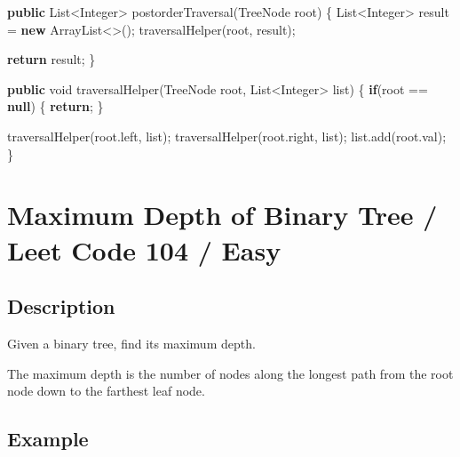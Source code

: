 \documentclass[]{book}
\newenvironment{Shaded}{\begin{snugshade}}{\end{snugshade}}
\newcommand{\BuiltInTok}[1]{#1}
\newcommand{\DataTypeTok}[1]{\textcolor[rgb]{0.13,0.29,0.53}{#1}}
\newcommand{\FunctionTok}[1]{\textcolor[rgb]{0.00,0.00,0.00}{#1}}
\newcommand{\KeywordTok}[1]{\textcolor[rgb]{0.13,0.29,0.53}{\textbf{#1}}}
\newcommand{\NormalTok}[1]{#1}
\begin{document}
\begin{Shaded}
\begin{Highlighting}[]
\KeywordTok{public} \BuiltInTok{List}\NormalTok{<}\BuiltInTok{Integer}\NormalTok{> }\FunctionTok{postorderTraversal}\NormalTok{(}\BuiltInTok{TreeNode}\NormalTok{ root) \{}
    \BuiltInTok{List}\NormalTok{<}\BuiltInTok{Integer}\NormalTok{> result = }\KeywordTok{new} \BuiltInTok{ArrayList}\NormalTok{<>();}
    \FunctionTok{traversalHelper}\NormalTok{(root, result);}

    \KeywordTok{return}\NormalTok{ result;}
\NormalTok{\}}

\KeywordTok{public} \DataTypeTok{void} \FunctionTok{traversalHelper}\NormalTok{(}\BuiltInTok{TreeNode}\NormalTok{ root, }\BuiltInTok{List}\NormalTok{<}\BuiltInTok{Integer}\NormalTok{> list) \{}
    \KeywordTok{if}\NormalTok{(root == }\KeywordTok{null}\NormalTok{) \{}
        \KeywordTok{return}\NormalTok{;}
\NormalTok{    \}}

    \FunctionTok{traversalHelper}\NormalTok{(root.}\FunctionTok{left}\NormalTok{, list);}
    \FunctionTok{traversalHelper}\NormalTok{(root.}\FunctionTok{right}\NormalTok{, list);}
\NormalTok{    list.}\FunctionTok{add}\NormalTok{(root.}\FunctionTok{val}\NormalTok{);}
\NormalTok{\}}
\end{Highlighting}
\end{Shaded}

\hypertarget{maximum-depth-of-binary-tree-leet-code-104-easy}{%
\section{Maximum Depth of Binary Tree / Leet Code 104 / Easy}\label{maximum-depth-of-binary-tree-leet-code-104-easy}}

\hypertarget{description-65}{%
\subsection{Description}\label{description-65}}

Given a binary tree, find its maximum depth.

The maximum depth is the number of nodes along the longest path from the root node down to the farthest leaf
node.

\hypertarget{example-62}{%
\subsection{Example}\label{example-62}}
\end{document}
